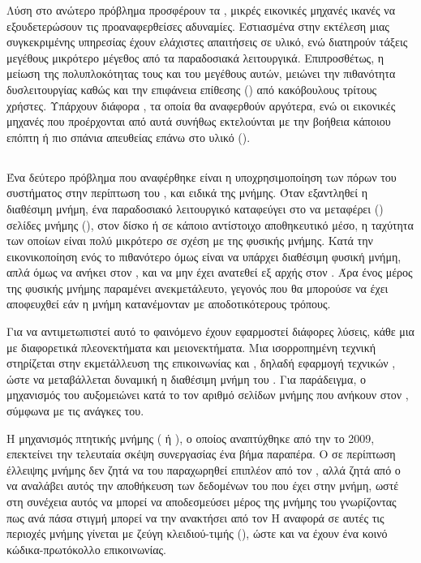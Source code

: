 Λύση στο ανώτερο πρόβλημα προσφέρουν τα , μικρές εικονικές μηχανές
ικανές να εξουδετερώσουν τις προαναφερθείσες αδυναμίες. Εστιασμένα στην εκτέλεση μιας
συγκεκριμένης υπηρεσίας έχουν ελάχιστες απαιτήσεις σε υλικό, ενώ
διατηρούν τάξεις μεγέθους μικρότερο μέγεθος από τα παραδοσιακά λειτουργικά.
Επιπροσθέτως, η μείωση της πολυπλοκότητας τους και του μεγέθους αυτών,
μειώνει την πιθανότητα δυσλειτουργίας καθώς και την επιφάνεια επίθεσης
() από κακόβουλους τρίτους χρήστες\cite{unikernelsDef}. Υπάρχουν διάφορα
, τα οποία θα αναφερθούν αργότερα, ενώ οι εικονικές
μηχανές που προέρχονται από αυτά συνήθως εκτελούνται με την βοήθεια
κάποιου επόπτη ή πιο σπάνια απευθείας επάνω στο υλικό ().

\subsection{}

Ένα δεύτερο πρόβλημα που αναφέρθηκε είναι η υποχρησιμοποίηση των πόρων
του συστήματος στην περίπτωση του , και ειδικά της
μνήμης. Όταν εξαντληθεί η διαθέσιμη μνήμη, ένα παραδοσιακό λειτουργικό
καταφεύγει στο να μεταφέρει () σελίδες μνήμης (),
στον δίσκο ή σε κάποιο αντίστοιχο αποθηκευτικό μέσο, η ταχύτητα των
οποίων είναι πολύ μικρότερο σε σχέση με της φυσικής μνήμης. Κατά
την εικονικοποίηση ενός  το πιθανότερο όμως είναι να υπάρχει
διαθέσιμη φυσική μνήμη, απλά όμως να ανήκει στον , και να μην
έχει ανατεθεί εξ αρχής στον . Άρα ένος μέρος της φυσικής μνήμης παραμένει
ανεκμετάλευτο, γεγονός που θα μπορούσε να έχει αποφευχθεί εάν η μνήμη κατανέμονταν
με αποδοτικότερους τρόπους.
\newline

Για να αντιμετωπιστεί αυτό το φαινόμενο έχουν εφαρμοστεί διάφορες
λύσεις, κάθε μια με διαφορετικά πλεονεκτήματα και μειονεκτήματα.
Μια ισορροπημένη τεχνική στηρίζεται στην εκμετάλλευση της  επικοινωνίας
 και , δηλαδή εφαρμογή τεχνικών ,
ώστε να μεταβάλλεται δυναμική η διαθέσιμη μνήμη του . Για
παράδειγμα, ο μηχανισμός του  αυξομειώνει κατά το  τον αριθμό
σελίδων μνήμης που ανήκουν στον , σύμφωνα με τις ανάγκες του.
\newline

Η μηχανισμός πτητικής μνήμης ( ή ), ο οποίος
αναπτύχθηκε από την  το 2009, επεκτείνει την τελευταία σκέψη
συνεργασίας  ένα βήμα παραπέρα. Ο  σε περίπτωση έλλειψης
μνήμης δεν ζητά να του παραχωρηθεί επιπλέον από τον , αλλά ζητά
από ο  να αναλάβει αυτός την αποθήκευση των δεδομένων του που
έχει στην μνήμη, ωστέ στη συνέχεια αυτός να μπορεί να αποδεσμεύσει μέρος
της μνήμης του γνωρίζοντας πως ανά πάσα στιγμή μπορεί να την ανακτήσει
από τον   Η αναφορά σε αυτές τις περιοχές μνήμης γίνεται με ζεύγη
κλειδιού-τιμής (), ώστε  και  να έχουν ένα κοινό
κώδικα-πρωτόκολλο επικοινωνίας\cite{tmemXenSummit}\cite{Aimilios}.
\newline

